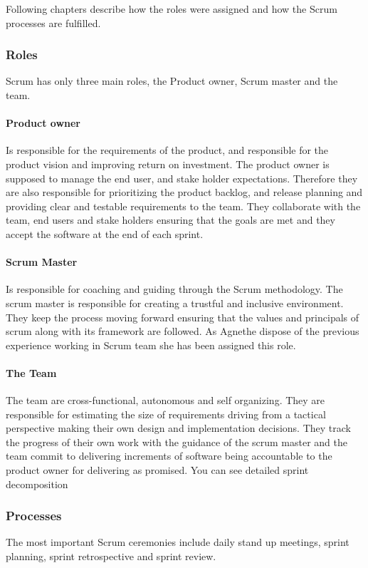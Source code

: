 Following chapters describe how the roles were assigned and how the Scrum processes are fulfilled.

\subsubsection{Roles}
Scrum has only three main roles, the Product owner, Scrum master and the team.

\paragraph{Product owner}
Is responsible for the requirements of the product, and responsible for the product vision and improving return on investment. The product owner is supposed to manage the end user, and stake holder expectations. Therefore they are also responsible for prioritizing the product backlog, and release planning and providing clear and testable requirements to the team.  They collaborate with the team, end users and stake holders ensuring that the goals are met and they accept the software at the end of each sprint.  

\paragraph{Scrum Master}
Is responsible for coaching and guiding through the Scrum methodology. The scrum master is responsible for creating a trustful and inclusive environment. They keep the process moving forward ensuring that the values and principals of scrum along with its framework are followed. As Agnethe dispose of the previous experience working in Scrum team she has been assigned this role.

\paragraph{The Team}
The team are cross-functional, autonomous and self organizing.  They are responsible for estimating the size of requirements driving from a tactical perspective making their own design and implementation decisions. They track the progress of their own work with the guidance of the scrum master and the team commit to delivering increments of software  being accountable to the product owner for delivering as promised.
You can see detailed sprint decomposition 

\subsubsection{Processes}
The most important Scrum ceremonies include daily stand up meetings, sprint planning, sprint retrospective and sprint review.

